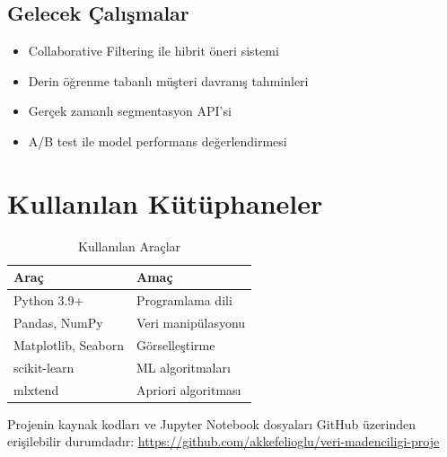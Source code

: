 \documentclass[conference]{IEEEtran}
\begin{document}
\subsection{Gelecek Çalışmalar}
\begin{itemize}[leftmargin=*]
    \item Collaborative Filtering ile hibrit öneri sistemi
    \item Derin öğrenme tabanlı müşteri davranış tahminleri
    \item Gerçek zamanlı segmentasyon API'si
    \item A/B test ile model performans değerlendirmesi
\end{itemize}

\section{Kullanılan Kütüphaneler}

\begin{table}[h]
\centering
\caption{Kullanılan Araçlar}
\label{tab:tools}
\begin{tabular}{ll}
\toprule
\textbf{Araç} & \textbf{Amaç} \\
\midrule
Python 3.9+ & Programlama dili \\
Pandas, NumPy & Veri manipülasyonu \\
Matplotlib, Seaborn & Görselleştirme \\
scikit-learn & ML algoritmaları \\
mlxtend & Apriori algoritması \\
\bottomrule
\end{tabular}
\end{table}

Projenin kaynak kodları ve Jupyter Notebook dosyaları GitHub üzerinden erişilebilir durumdadır: \url{https://github.com/akkefelioglu/veri-madenciligi-proje}

\end{document}
